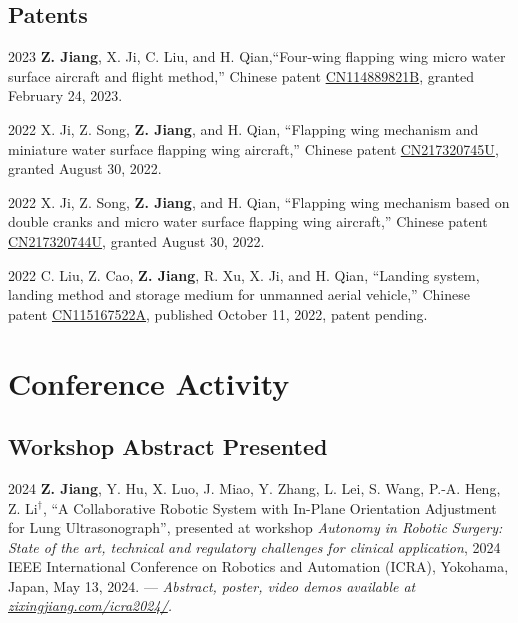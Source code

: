 \documentclass[11pt,letterpaper]{report}
\begin{document}
\subsection*{Patents}
\begin{tablist}		
	\item[2023]   \tab{}\textbf{Z. Jiang}, X. Ji, C. Liu, and H. Qian,``Four-wing flapping wing micro water surface aircraft and flight method,'' Chinese patent \href{https://patents.google.com/patent/CN114889821B/en?oq=CN114889821B}{CN114889821B}, granted February 24, 2023.
		
	\item[2022]   \tab{}X. Ji, Z. Song, \textbf{Z. Jiang}, and H. Qian, ``Flapping wing mechanism and miniature water surface flapping wing aircraft,'' Chinese patent \href{https://patents.google.com/patent/CN217320745U/en?oq=CN217320745U}{CN217320745U}, granted August 30, 2022.  
		
	\item[2022]   \tab{}X. Ji, Z. Song, \textbf{Z. Jiang}, and H. Qian, ``Flapping wing mechanism based on double cranks and micro water surface flapping wing aircraft,'' Chinese patent \href{https://patents.google.com/patent/CN217320744U/en?oq=CN217320744U}{CN217320744U}, granted August 30, 2022.  
		
	\item[2022]   \tab{}C. Liu, Z. Cao, \textbf{Z. Jiang}, R. Xu, X. Ji, and H. Qian, ``Landing system, landing method and storage medium for unmanned aerial vehicle,'' Chinese patent \href{https://patents.google.com/patent/CN115167522A/en?oq=CN115167522A}{CN115167522A}, published October 11, 2022, patent pending.
\end{tablist}
	
	
	
\section*{Conference Activity}
\subsection*{Workshop Abstract Presented}
\begin{tablist}
	\item[2024] \tab \textbf{Z. Jiang}, Y. Hu, X. Luo, J. Miao, Y. Zhang, L. Lei, S. Wang, P.-A. Heng, Z. Li$^\dagger$, ``A Collaborative Robotic System with In-Plane Orientation Adjustment for Lung Ultrasonograph'', presented at workshop \textit{Autonomy in Robotic Surgery: State of the art, technical and regulatory challenges for clinical application}, 2024 IEEE International Conference on Robotics and Automation (ICRA), Yokohama, Japan, May 13, 2024. --- \textit{Abstract, poster, video demos available at \href{https://www.zixingjiang.com/icra2024/}{zixingjiang.com/icra2024/}.}
\end{tablist}
	
\end{document}
